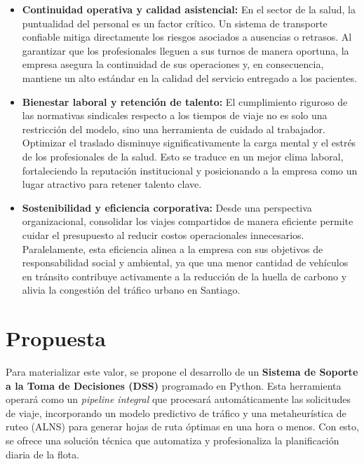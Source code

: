 \begin{itemize}
    \item \textbf{Continuidad operativa y calidad asistencial:} En el sector de la salud, la puntualidad del personal es un factor crítico. Un sistema de transporte confiable mitiga directamente los riesgos asociados a ausencias o retrasos. Al garantizar que los profesionales lleguen a sus turnos de manera oportuna, la empresa asegura la continuidad de sus operaciones y, en consecuencia, mantiene un alto estándar en la calidad del servicio entregado a los pacientes.
    
    \item \textbf{Bienestar laboral y retención de talento:} El cumplimiento riguroso de las normativas sindicales respecto a los tiempos de viaje no es solo una restricción del modelo, sino una herramienta de cuidado al trabajador. Optimizar el traslado disminuye significativamente la carga mental y el estrés de los profesionales de la salud. Esto se traduce en un mejor clima laboral, fortaleciendo la reputación institucional y posicionando a la empresa como un lugar atractivo para retener talento clave.
    
    \item \textbf{Sostenibilidad y eficiencia corporativa:} Desde una perspectiva organizacional, consolidar los viajes compartidos de manera eficiente permite cuidar el presupuesto al reducir costos operacionales innecesarios. Paralelamente, esta eficiencia alinea a la empresa con sus objetivos de responsabilidad social y ambiental, ya que una menor cantidad de vehículos en tránsito contribuye activamente a la reducción de la huella de carbono y alivia la congestión del tráfico urbano en Santiago.
\end{itemize}


\section{Propuesta}
Para materializar este valor, se propone el desarrollo de un \textbf{Sistema de Soporte a la Toma de Decisiones (DSS)} programado en Python. Esta herramienta operará como un \textit{pipeline integral} que procesará automáticamente las solicitudes de viaje, incorporando un modelo predictivo de tráfico y una metaheurística de ruteo (ALNS) para generar hojas de ruta óptimas en una hora o menos. Con esto, se ofrece una solución técnica que automatiza y profesionaliza la planificación diaria de la flota.



